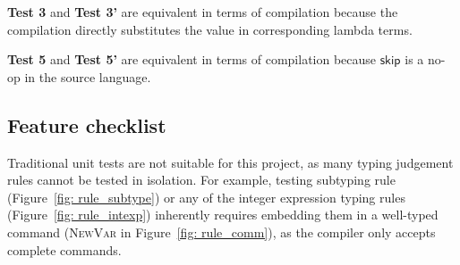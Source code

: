 \documentclass[12pt,a4paper]{report}
\theoremstyle{definition}
\begin{document}
    \textbf{Test 3} and \textbf{Test 3'} are equivalent in terms of compilation because the compilation directly substitutes the value in corresponding lambda terms. 
    
    \textbf{Test 5} and \textbf{Test 5'} are equivalent in terms of compilation because $\mathsf{skip}$ is a no-op in the source language.

    \subsection{Feature checklist}
    Traditional unit tests are not suitable for this project, as many typing judgement rules cannot be tested in isolation. For example, testing subtyping rule (Figure~\ref{fig: rule_subtype}) or any of the integer expression typing rules (Figure~\ref{fig: rule_intexp}) inherently requires embedding them in a well-typed command (\textsc{NewVar} in Figure~\ref{fig: rule_comm}), as the compiler only accepts complete commands. 
\end{document}
